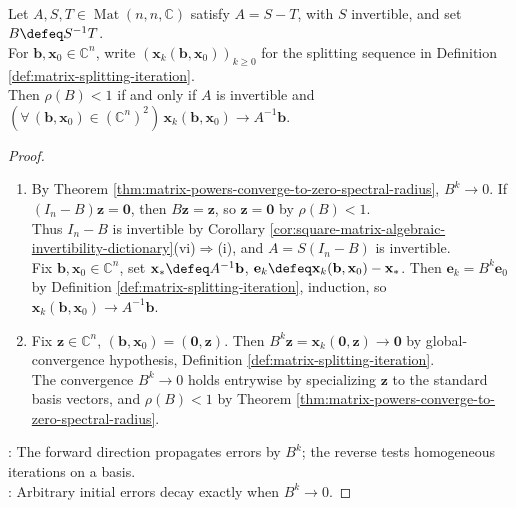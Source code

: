 \begin{theorem} \label{thm:splitting-iteration-convergence-spectral-radius} \\
Let $A,S,T\in\operatorname{Mat}(n,n,\mathbb{C})$ satisfy $A=S-T$, with $S$ invertible, and set $B\defeq S^{-1}T$.\\
For $\mathbf{b},\mathbf{x}_0\in\mathbb{C}^n$, write $(\mathbf{x}_k(\mathbf{b},\mathbf{x}_0))_{k\geq0}$ for the splitting sequence in Definition \ref{def:matrix-splitting-iteration}.\\
Then $\rho(B)<1$ if and only if $A$ is invertible and $(\forall\,(\mathbf{b},\mathbf{x}_0)\in(\mathbb{C}^n)^2)\,\mathbf{x}_k(\mathbf{b},\mathbf{x}_0)\to A^{-1}\mathbf{b}$.
\begin{proof}
\begin{enumerate}[label=\roman*.]
\setlength{\itemsep}{0pt}
\item[$(\Rightarrow)$] By Theorem \ref{thm:matrix-powers-converge-to-zero-spectral-radius}, $B^k\to0$. If $(I_n-B)\mathbf{z}=\mathbf{0}$, then $B\mathbf{z}=\mathbf{z}$, so $\mathbf{z}=\mathbf{0}$ by $\rho(B)<1$.\\
Thus $I_n-B$ is invertible by Corollary \ref{cor:square-matrix-algebraic-invertibility-dictionary}(vi)$\Rightarrow$(i), and $A=S(I_n-B)$ is invertible.\\
Fix $\mathbf{b},\mathbf{x}_0\in\mathbb{C}^n$, set $\mathbf{x}_*\defeq A^{-1}\mathbf{b}$,  $\mathbf{e}_k\defeq\mathbf{x}_k(\mathbf{b},\mathbf{x}_0)-\mathbf{x}_*$. Then $\mathbf{e}_k=B^k\mathbf{e}_0$ by Definition \ref{def:matrix-splitting-iteration}, induction, so $\mathbf{x}_k(\mathbf{b},\mathbf{x}_0)\to A^{-1}\mathbf{b}$.
\item[$(\Leftarrow)$] Fix $\mathbf{z}\in\mathbb{C}^n$, $(\mathbf{b},\mathbf{x}_0)=(\mathbf{0},\mathbf{z})$. Then $B^k\mathbf{z}=\mathbf{x}_k(\mathbf{0},\mathbf{z})\to\mathbf{0}$ by global-convergence hypothesis, Definition \ref{def:matrix-splitting-iteration}.\\
The convergence $B^k\to0$ holds entrywise by specializing $\mathbf{z}$ to the standard basis vectors, and $\rho(B)<1$ by Theorem \ref{thm:matrix-powers-converge-to-zero-spectral-radius}.
\end{enumerate}
: The forward direction propagates errors by $B^k$; the reverse tests homogeneous iterations on a basis.\\
: Arbitrary initial errors decay exactly when $B^k\to0$.
\end{proof}
\end{theorem}

